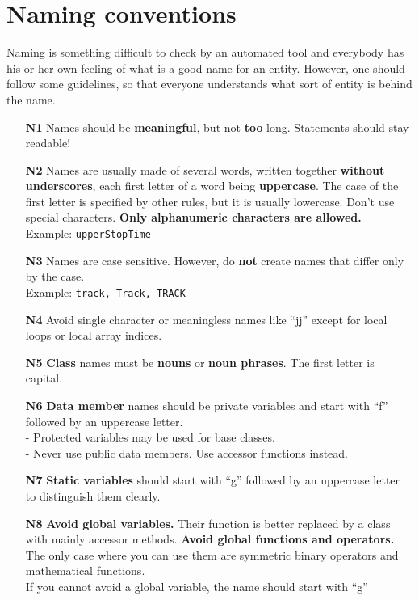 \section{Naming conventions}

Naming is something difficult to check by an automated tool and everybody has
his or her own feeling of what is a good name for an entity. However, one
should follow some guidelines, so that everyone understands what sort of
entity is behind the name.

\begin{itemize}
\item[\bf N1] Names should be {\bf meaningful}, but not {\bf too} long. 
  Statements should stay readable!
\item[\bf N2] Names are usually made of several words, written together
  {\bf without underscores}, each first letter of a word being {\bf uppercase}.
  The case of the first letter is specified by other rules, but it is
  usually lowercase. Don't use special characters. {\bf Only alphanumeric 
  characters are allowed.}\\
  Example: {\tt upperStopTime}
\item[\bf N3] Names are case sensitive. However, do {\bf not} create names
  that differ only by the case.\\
  Example: {\tt track, Track, TRACK}
\item[\bf N4] Avoid single character or meaningless names like ``jj'' except
  for local loops or local array indices.
\item[\bf N5] {\bf Class} names must be {\bf nouns} or {\bf noun phrases}. 
  The first letter is capital.
\item[\bf N6] {\bf Data member} names should be private variables and start
  with ``f'' followed by an uppercase letter.\\
  - Protected variables may be used for base classes.\\
  - Never use public data members. Use accessor functions instead.
\item[\bf N7] {\bf Static variables} should start with ``g'' followed by
  an uppercase letter to distinguish them clearly.
\item[\bf N8] {\bf Avoid global variables.} Their function is better
  replaced by a class with mainly accessor methods. {\bf Avoid global
  functions and operators.} The only case where you can use them are
  symmetric binary operators and mathematical functions.\\
  If you cannot avoid a global variable, the name should start with ``g''

\end{itemize}
